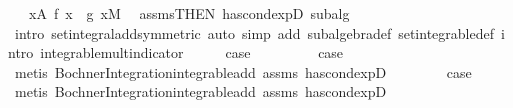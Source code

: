 \begin{isabellebody}
\ {\isachardoublequoteopen}{\isachardot}{\kern0pt}{\isachardot}{\kern0pt}{\isachardot}{\kern0pt}\ {\isacharequal}{\kern0pt}\ {\isasymintegral}x{\isasymin}A{\isachardot}{\kern0pt}\ {\isacharparenleft}{\kern0pt}f{\isacharprime}{\kern0pt}\ x\ {\isacharplus}{\kern0pt}\ g{\isacharprime}{\kern0pt}\ x{\isacharparenright}{\kern0pt}{\isasympartial}M{\isachardoublequoteclose}\ \isamarkupfalse%
\ assms{\isacharbrackleft}{\kern0pt}THEN\ has{\isacharunderscore}{\kern0pt}cond{\isacharunderscore}{\kern0pt}expD{\isacharparenleft}{\kern0pt}{}{\isacharparenright}{\kern0pt}{\isacharbrackright}{\kern0pt}\ subalg\ {}\ \isamarkupfalse%
\ {\isacharparenleft}{\kern0pt}intro\ set{\isacharunderscore}{\kern0pt}integral{\isacharunderscore}{\kern0pt}add{\isacharparenleft}{\kern0pt}{}{\isacharparenright}{\kern0pt}{\isacharbrackleft}{\kern0pt}symmetric{\isacharbrackright}{\kern0pt}{\isacharcomma}{\kern0pt}\ auto\ simp\ add{\isacharcolon}{\kern0pt}\ subalgebra{\isacharunderscore}{\kern0pt}def\ set{\isacharunderscore}{\kern0pt}integrable{\isacharunderscore}{\kern0pt}def\ intro{\isacharcolon}{\kern0pt}\ integrable{\isacharunderscore}{\kern0pt}mult{\isacharunderscore}{\kern0pt}indicator{\isacharparenright}{\kern0pt}\isanewline
\ \ \isamarkupfalse%
\ \isamarkupfalse%
\ {\isacharquery}{\kern0pt}case\ \isacommand{{\isachardot}{\kern0pt}}\isamarkupfalse%
\isanewline
{}\isamarkupfalse%
\isanewline
\ \ \isamarkupfalse%
\ {}\isanewline
\ \ \isamarkupfalse%
\ {\isacharquery}{\kern0pt}case\ \isamarkupfalse%
\ {\isacharparenleft}{\kern0pt}metis\ Bochner{\isacharunderscore}{\kern0pt}Integration{\isachardot}{\kern0pt}integrable{\isacharunderscore}{\kern0pt}add\ assms\ has{\isacharunderscore}{\kern0pt}cond{\isacharunderscore}{\kern0pt}expD{\isacharparenleft}{\kern0pt}{}{\isacharparenright}{\kern0pt}{\isacharparenright}{\kern0pt}\isanewline
{}\isamarkupfalse%
\isanewline
\ \ \isamarkupfalse%
\ {}\isanewline
\ \ \isamarkupfalse%
\ {\isacharquery}{\kern0pt}case\ \isamarkupfalse%
\ {\isacharparenleft}{\kern0pt}metis\ Bochner{\isacharunderscore}{\kern0pt}Integration{\isachardot}{\kern0pt}integrable{\isacharunderscore}{\kern0pt}add\ assms\ has{\isacharunderscore}{\kern0pt}cond{\isacharunderscore}{\kern0pt}expD{\isacharparenleft}{\kern0pt}{}{\isacharparenright}{\kern0pt}{\isacharparenright}{\kern0pt}\isanewline
{}\isamarkupfalse%

\end{isabellebody}
